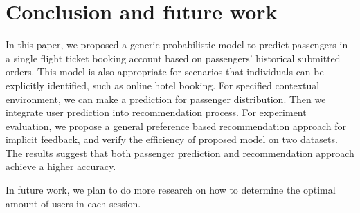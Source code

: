 \documentclass{llncs}
\begin{document}
\section{Conclusion and future work}
\label{sec:con}
In this paper, we proposed a generic probabilistic model to predict passengers in a single flight ticket booking account based on passengers' historical submitted orders. This model is also appropriate for scenarios that individuals can be explicitly identified, such as online hotel booking. For specified contextual environment, we can make a prediction for passenger distribution. Then we integrate user prediction into recommendation process. For experiment evaluation, we propose a general preference based recommendation approach for implicit feedback, and verify the efficiency of proposed model on two datasets. The results suggest that both passenger prediction and recommendation approach achieve a higher accuracy. \par
In future work, we plan to do more research on how to determine the optimal amount of users in each session. 
\end{document}
